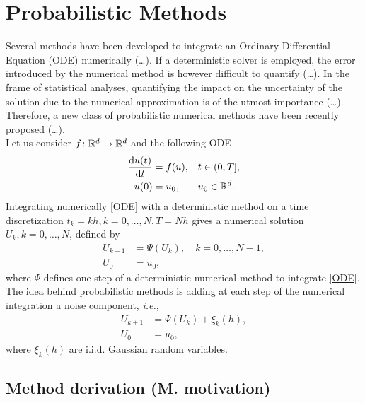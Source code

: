 \section{Probabilistic Methods}

Several methods have been developed to integrate an Ordinary Differential Equation (ODE) numerically (\ldots). If a deterministic solver is employed, the error introduced by the numerical method is however difficult to quantify (\ldots). In the frame of statistical analyses, quantifying the impact on the uncertainty of the solution due to the numerical approximation is of the utmost importance (\ldots). Therefore, a new class of probabilistic numerical methods have been recently proposed \cite{CGS16} (\ldots). \\
Let us consider $f\colon \mathbb{R}^d \to \mathbb{R}^d$ and the following ODE
\begin{equation}\label{ODE}
\begin{aligned}
	\dv{u(t)}{t} &= f(u), &&  t \in (0, T], \\
	u(0) &= u_0, && u_0 \in \mathbb{R}^d.
\end{aligned}
\end{equation}
Integrating numerically \eqref{ODE} with a deterministic method on a time discretization $t_k = kh, k = 0, \ldots, N, T = Nh$ gives a numerical solution $U_k, k = 0, \ldots, N$, defined by
\begin{equation}\label{numericalODE}
\begin{aligned}
	U_{k+1} &= \Psi(U_k), \quad k = 0, \ldots, N-1, \\
	U_{0} &= u_0, 
\end{aligned}
\end{equation}
where $\Psi$ defines one step of a deterministic numerical method to integrate \eqref{ODE}. \\
The idea behind probabilistic methods is adding at each step of the numerical integration a noise component, \textit{i.e.},
\begin{equation}\label{probabilityODE}
\begin{aligned}
	U_{k+1} &= \Psi(U_k) + \xi_k(h), \\
	U_0 &= u_0,
\end{aligned}
\end{equation}
where $\xi_k(h)$ are i.i.d. Gaussian random variables. 



\subsection{Method derivation (M. motivation)}






